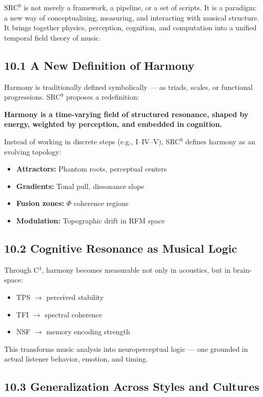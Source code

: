 \documentclass[10pt]{article}
\begin{document}
SRC$^{9}$ is not merely a framework, a pipeline, or a set of scripts. It is a paradigm: a new way of conceptualizing, measuring, and interacting with musical structure. It brings together physics, perception, cognition, and computation into a unified temporal field theory of music.

\subsection*{10.1 A New Definition of Harmony}

Harmony is traditionally defined symbolically — as triads, scales, or functional progressions. SRC$^{9}$ proposes a redefinition:

\textbf{Harmony is a time-varying field of structured resonance, shaped by energy, weighted by perception, and embedded in cognition.}

Instead of working in discrete steps (e.g., I–IV–V), SRC$^{9}$ defines harmony as an evolving topology:

\begin{itemize}
    \item \textbf{Attractors:} Phantom roots, perceptual centers
    \item \textbf{Gradients:} Tonal pull, dissonance slope
    \item \textbf{Fusion zones:} $\Phi$ coherence regions
    \item \textbf{Modulation:} Topographic drift in RFM space
\end{itemize}

\subsection*{10.2 Cognitive Resonance as Musical Logic}

Through C$^{3}$, harmony becomes measurable not only in acoustics, but in brain-space:

\begin{itemize}
    \item TPS $\rightarrow$ perceived stability
    \item TFI $\rightarrow$ spectral coherence
    \item NSF $\rightarrow$ memory encoding strength
\end{itemize}

This transforms music analysis into neuroperceptual logic — one grounded in actual listener behavior, emotion, and timing.

\subsection*{10.3 Generalization Across Styles and Cultures}
\end{document}
